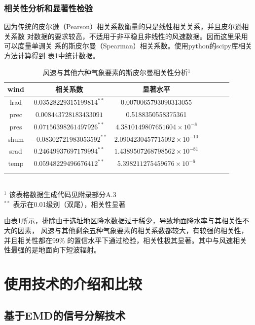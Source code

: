 \documentclass[AutoFakeBold]{LZUThesis}
\begin{document}
\subsection{相关性分析和显著性检验}
因为传统的皮尔逊（Pearson）相关系数衡量的只是线性相关关系，并且皮尔逊相关系数
对数据的要求较高，不适用于非平稳且非线性的风速数据。因而这里采用可以度量单调关
系的斯皮尔曼（Spearman）相关系数。使用python的scipy库相关方法计算得到
表\ref{relativity-analysis}中统计数据。

\begin{table}[H]
    \centering
    \caption{风速与其他六种气象要素的斯皮尔曼相关性分析$^1$}
    \begin{tabular}{ccccccc}
    \toprule
    wind & 相关系数 & 显著水平 \\
    \midrule
    lrad & $0.03528229315199814^{**}$ & 0.0070065793090313055 \\
    prec & $0.008443728183433091$ & 0.5188350558375361 \\
    pres & $0.07156398261497926^{**}$ & $4.3810149807651604\times10^{-8}$ \\
    shum & $-0.08302721983053592^{**}$ & $2.0904230457715092\times10^{-10}$ \\
    srad & $0.24649937697179994^{**}$ & $1.4389507268798562\times10^{-81}$ \\
    temp & $0.05948229496676412^{**}$ & $5.398211275459676\times10^{-6}$ \\
    \bottomrule \\
    \end{tabular} \\
    \footnotesize{$^1$ 该表格数据生成代码见附录部分A.3} \\
    \footnotesize{$^{**}$ 表示在0.01级别（双尾），相关性显著} \\
    \label{relativity-analysis}
\end{table}

由表\ref{relativity-analysis}所示，排除由于选址地区降水数据过于稀少，导致地面降水率与其相关性不大的因素，
风速与其他剩余五种气象要素的相关系数都较大，有较强的相关性，并且相关性都在99\%
的置信水平下通过检验，相关性极其显著。其中与风速相关性最强的是地面向下短波辐射。



\chapter{使用技术的介绍和比较}
\section{基于EMD的信号分解技术}
\end{document}
